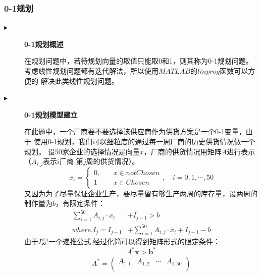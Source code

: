 \documentclass[withoutpreface,bwprint]{cumcmthesis}
\begin{document}
\subsubsection*{0-1规划}
\begin{description}
    \item[$\blacktriangleright$] \textbf{0-1规划概述}\par
        在规划问题中，若待规划向量的取值只能取0和1，则其称为0-1规划问题。
        考虑线性规划问题都有迭代解法，所以使用$MATLAB$的$linprog$函数可以方便的
        解决此类线性规划问题。
    \item[$\blacktriangleright$] \textbf{0-1规划模型建立}\par
        在此题中，一个厂商要不要选择该供应商作为供货方案是一个0-1变量，由于
        使用0-1规划，我们可以细粒度的通过每一周厂商的历史供货情况做一个规划。
        设50家企业的选择情况是向量$x$，厂商的供货情况用矩阵$A$进行表示（$A_{i,j}$表示$i$厂商
        第$j$周的供货情况）。
        \begin{equation}
            x_i = \left\{
            \begin{aligned}
                0,\quad & x \in notChosen \\
                1 \quad & x \in Chosen
            \end{aligned}
            \right.,\quad i=0,1,\cdots,50 \nonumber
        \end{equation}
        又因为为了尽量保证企业生产，要尽量留有够生产两周的库存量，设两周的制作量为$b$，有限定条件：
        \begin{equation}
            \begin{aligned}
                \sum_{i=1}^{50} A_{i,j} \cdot x_i & + I_{j-1}  > b                                             \\
                where. I_{j}  = I_{j-1}           & + \sum_{i=1}^{50} A_{i,j} \cdot x_i + I_{j-1} -b \nonumber
            \end{aligned}
        \end{equation}
        由于$I$是一个递推公式,经过化简可以得到矩阵形式的限定条件：
        \begin{equation}
            A^{*} \bm{x} > \bm{b^{*}} \nonumber
        \end{equation}
        {\small
        \begin{equation}
            \begin{aligned}
                A^* =
                \begin{pmatrix}
                    A_{1,1}                                & A_{1,2}                                & \cdots & A_{1,50}                                  \\

\end{pmatrix}
\end{aligned}
\end{equation}}
\end{description}
\end{document}
